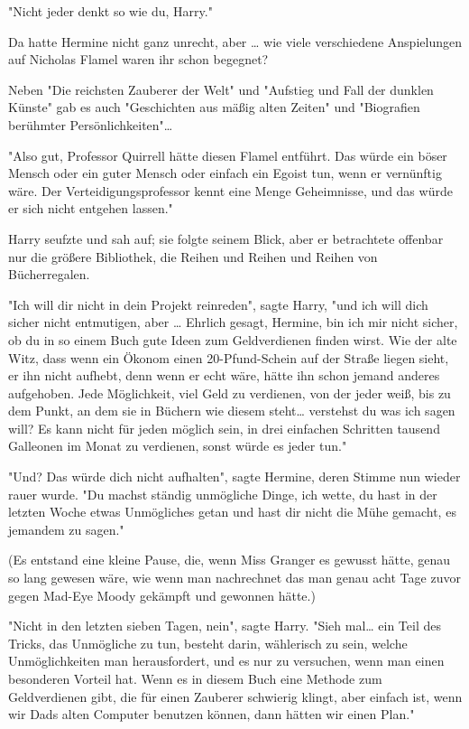 {"Nicht jeder denkt so wie du, Harry."

Da hatte Hermine nicht ganz unrecht, aber … wie viele verschiedene Anspielungen auf Nicholas Flamel waren ihr schon begegnet?

Neben "Die reichsten Zauberer der Welt" und "Aufstieg und Fall der dunklen Künste" gab es auch "Geschichten aus mäßig alten Zeiten" und "Biografien berühmter Persönlichkeiten"…

"Also gut, Professor Quirrell hätte diesen Flamel entführt. Das würde ein böser Mensch oder ein guter Mensch oder einfach ein Egoist tun, wenn er vernünftig wäre. Der Verteidigungsprofessor kennt eine Menge Geheimnisse, und das würde er sich nicht entgehen lassen."

Harry seufzte und sah auf; sie folgte seinem Blick, aber er betrachtete offenbar nur die größere Bibliothek, die Reihen und Reihen und Reihen von Bücherregalen.

"Ich will dir nicht in dein Projekt reinreden", sagte Harry, "und ich will dich sicher nicht entmutigen, aber … Ehrlich gesagt, Hermine, bin ich mir nicht sicher, ob du in so einem Buch gute Ideen zum Geldverdienen finden wirst. Wie der alte Witz, dass wenn ein Ökonom einen 20-Pfund-Schein auf der Straße liegen sieht, er ihn nicht aufhebt, denn wenn er echt wäre, hätte ihn schon jemand anderes aufgehoben. Jede Möglichkeit, viel Geld zu verdienen, von der jeder weiß, bis zu dem Punkt, an dem sie in Büchern wie diesem steht… verstehst du was ich sagen will? Es kann nicht für jeden möglich sein, in drei einfachen Schritten tausend Galleonen im Monat zu verdienen, sonst würde es jeder tun."

"Und? Das würde dich nicht aufhalten", sagte Hermine, deren Stimme nun wieder rauer wurde. "Du machst ständig unmögliche Dinge, ich wette, du hast in der letzten Woche etwas Unmögliches getan und hast dir nicht die Mühe gemacht, es jemandem zu sagen."

(Es entstand eine kleine Pause, die, wenn Miss Granger es gewusst hätte, genau so lang gewesen wäre, wie wenn man nachrechnet das man genau acht Tage zuvor gegen Mad-Eye Moody gekämpft und gewonnen hätte.)

"Nicht in den letzten sieben Tagen, nein", sagte Harry. "Sieh mal… ein Teil des Tricks, das Unmögliche zu tun, besteht darin, wählerisch zu sein, welche Unmöglichkeiten man herausfordert, und es nur zu versuchen, wenn man einen besonderen Vorteil hat. Wenn es in diesem Buch eine Methode zum Geldverdienen gibt, die für einen Zauberer schwierig klingt, aber einfach ist, wenn wir Dads alten Computer benutzen können, dann hätten wir einen Plan."

}
